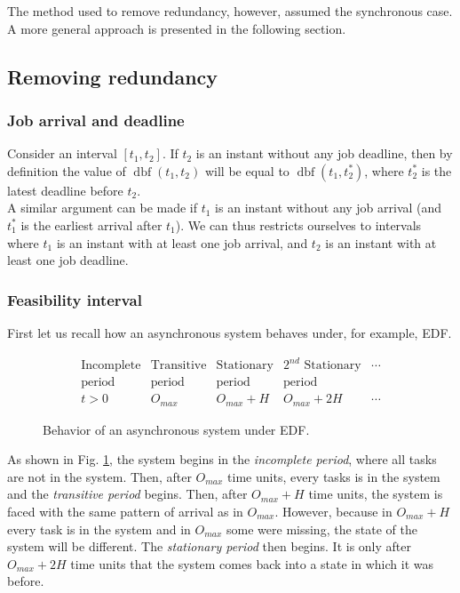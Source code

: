 \documentclass[times, 10pt,twocolumn, a4paper]{article}
\newcommand{\dbf}[1]{\operatorname{dbf}(#1)}
\begin{document}
  The method used to remove redundancy, however, assumed the synchronous case. A more general approach is presented in the following section.

  \subsection{Removing redundancy}

\subsubsection{Job arrival and deadline}

Consider an interval $[t_1, t_2]$. If $t_2$ is an instant without any job deadline, then by definition the value of $\dbf{t_1, t_2}$ will be equal to $\dbf{t_1, t_2^*}$, where $t_2^*$ is the latest deadline before $t_2$.\\

A similar argument can be made if $t_1$ is an instant without any job arrival (and $t_1^*$ is the earliest arrival after $t_1$). We can thus restricts ourselves to intervals where $t_1$ is an instant with at least one job arrival, and $t_2$ is an instant with at least one job deadline.

  \subsubsection{Feasibility interval}

  First let us recall how an asynchronous system behaves under, for example, EDF.\\

\begin{figure}[h]
$$
\begin{array}{|c|c|c|c|l}
   \text{Incomplete} & \text{Transitive} & \text{Stationary} & \text{$2^{nd}$ Stationary} & \cdots \\
   \text{period} & \text{period} & \text{period} & \text{period} & \\
  \hline
  t > 0 & O_{max} & O_{max} + H & O_{max} + 2H & \cdots
\end{array}
$$
\begin{center}
\caption{Behavior of an asynchronous system under EDF.}
\label{fig:asyncBehavior}
\end{center}
\end{figure}

As shown in Fig. \ref{fig:asyncBehavior}, the system begins in the \emph{incomplete period}, where all tasks are not in the system. Then, after $O_{max}$ time units, every tasks is in the system and the \emph{transitive period} begins. Then, after $O_{max} + H$ time units, the system is faced with the same pattern of arrival as in $O_{max}$. However, because in $O_{max} + H$ every task is in the system and in $O_{max}$ some were missing, the state of the system will be different. The \emph{stationary period} then begins. It is only after $O_{max} + 2H$ time units that the system comes back into a state in which it was before.\\
\end{document}
